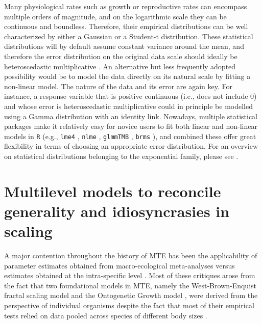 \documentclass[a4paper,12pt]{article}
\begin{document}
Many physiological rates such as growth or reproductive rates can encompass multiple orders of magnitude, and on the logarithmic scale they can be continuous and boundless. Therefore, their empirical distributions can be well characterized by either a Gaussian or a Student-t distribution. These statistical distributions will by default assume constant variance around the mean, and therefore the error distribution on the original data scale should ideally be heteroscedastic multiplicative \citep[see, e.g.,][Figure \ref{fig3}]{kerkhoff2009jtheorbiol, xiao2011ecology}. An alternative but less frequently adopted possibility would be to model the data directly on its natural scale by fitting a non-linear model. The nature of the data and its error are again key. For instance, a response variable that is positive continuous (i.e., does not include 0) and whose error is heteroscedastic multiplicative could in principle be modelled using a Gamma distribution with an identity link. Nowadays, multiple statistical packages make it relatively easy for novice users to fit both linear and non-linear models in \texttt{R} \citep{Rcitation} (e.g., \texttt{lme4} \cite{lme4}, \texttt{nlme} \cite{nlme}, \texttt{glmmTMB} \cite{glmmTMB}, \texttt{brms} \cite{brms}), and combined these offer great flexibility in terms of choosing an appropriate error distribution. For an overview on statistical distributions belonging to the exponential family, please see \cite{zuur2009book}.

\bigskip
\bigskip

\section{Multilevel models to reconcile generality and idiosyncrasies in scaling}

A major contention throughout the history of MTE has been the applicability of parameter estimates obtained from macro-ecological meta-analyses versus estimates obtained at the intra-specific level \citep{brody1945book, peters1983book, agutter2004theor, glazier2005biolrev, moses2008amnat, hirst2014ele, barneche2015pnas}. Most of these critiques arose from the fact that two foundational models in MTE, namely the West-Brown-Enquist fractal scaling model \citep{west1997science} and the Ontogenetic Growth model \citep{west2001nature}, were derived from the perspective of individual organisms despite the fact that most of their empirical tests relied on data pooled across species of different body sizes \citep[e.g.,][]{brown2004ecology, savage2004amnat}.
\end{document}
